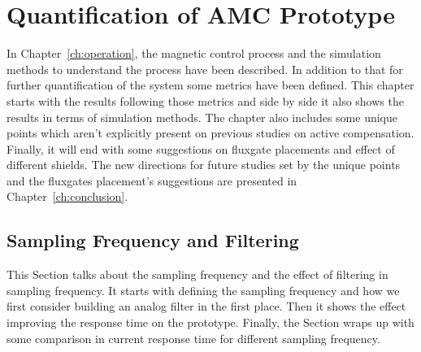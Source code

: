 

\chapter{Quantification of AMC Prototype}\label{ch:quantification}

In Chapter~\ref{ch:operation}, the magnetic control process and the simulation methods to understand the process have been described. In addition to that for further quantification of the system some metrics have been defined. This chapter starts with the results following those metrics and side by side it also shows the results in terms of simulation methods. The chapter also includes some unique points which aren't explicitly present on previous studies on active compensation. Finally, it will end with some suggestions on fluxgate placements and effect of different shields. The new directions for future studies set by the unique points and the fluxgates placement's suggestions are presented in Chapter~\ref{ch:conclusion}.


\section{Sampling Frequency and Filtering}\label{sec:freq}

This Section talks about the sampling frequency and the effect of filtering in sampling frequency. It starts with defining the sampling frequency and how we first consider building an analog filter in the first place. Then it shows the effect improving the response time on the prototype. Finally, the Section wraps up with some comparison in current response time for different sampling frequency.


